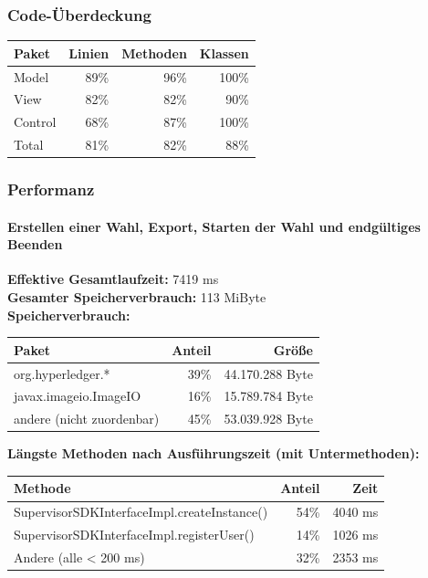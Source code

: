 \documentclass{beamer}
\begin{document}
\begin{frame}
\frametitle{Code-Überdeckung}
\begin{table}[h!]
	\begin{tabular}[t]{l r r r}
		Paket & Linien & Methoden & Klassen \\ 
		\hline
		Model & 89\% & 96\% & 100\% \\
		View & 82\% & 82\% & 90\% \\
		Control & 68\% & 87\% & 100\% \\ 
		\hline
		Total & 81\% & 82\% & 88\% \\
	\end{tabular}
\end{table}
\end{frame}

\begin{frame}
\frametitle{Performanz}
\framesubtitle{Erstellen einer Wahl, Export, Starten der Wahl und endgültiges Beenden}
	\textbf{Effektive Gesamtlaufzeit:} 7419 ms\\
	\textbf{Gesamter Speicherverbrauch:} 113 MiByte \\

	\pause
	\textbf{Speicherverbrauch:}
	\begin{table}[h!]
		\begin{tabular}[t]{l r r}
			Paket & Anteil & Größe \\ \hline
			org.hyperledger.* & 39\% & 44.170.288 Byte \\
			javax.imageio.ImageIO & 16\% & 15.789.784 Byte \\
			andere (nicht zuordenbar) & 45\% & 53.039.928 Byte \\
		\end{tabular}
	\end{table}

	\pause
	\textbf{Längste Methoden nach Ausführungszeit (mit Untermethoden):}
	\begin{table}[h!]
		\begin{tabular}[t]{lrr}
			Methode & Anteil & Zeit \\ \hline
			SupervisorSDKInterfaceImpl.createInstance() & 54\% & 4040 ms \\
			SupervisorSDKInterfaceImpl.registerUser() & 14\% & 1026 ms \\
			Andere (alle < 200 ms) & 32\% & 2353 ms
		\end{tabular}
	\end{table}
\end{frame}
\end{document}
